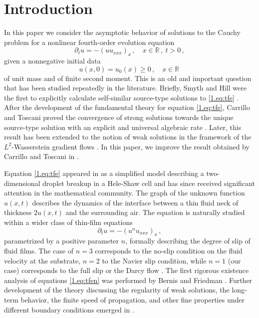 \documentclass[12pt]{amsart}
\let\pa\partial
\newcommand{\R}{{\mathbb R}}
\theoremstyle{plain}
\theoremstyle{definition}
\theoremstyle{remark}
\begin{document}
\section{Introduction}
In this paper we consider the asymptotic behavior of solutions to the Cauchy problem for a nonlinear fourth-order evolution equation
\begin{equation}\label{1.eq:tfe}
    \pa_t u = -\left(uu_{xxx}\right)_{x}\,, \quad x\in\R\,,\ t>0\,,
\end{equation}
given a nonnegative initial data 
\begin{equation}\label{1.eq:id}
    u(x,0) = u_0(x)\geq 0\,,\quad x\in\R\,
\end{equation}
of unit mass and of finite second moment. This is an old and important question that has been studied repeatedly in the literature. Briefly, Smyth and Hill were the first to explicitly calculate self-similar source-type solutions to \eqref{1.eq:tfe} \cite{SmHi88}. After the development of the fundamental theory \cite{BBD95, Ber96, BeFr90, BePu96} for equation \eqref{1.eq:tfe}, Carrillo and Toscani proved the convergence of strong solutions towards the unique source-type solution with an explicit and universal algebraic rate \cite{CaTo02}. Later, this result has been extended to the notion of weak solutions in the framework of the $L^2$-Wasserstein gradient flows \cite{MMS09}. 
In this paper, we improve the result obtained by Carrillo and Toscani in \cite{CaTo02}. 

Equation \eqref{1.eq:tfe} appeared in \cite{CDGKSZ93} as a simplified model describing a two-dimensional droplet breakup in a Hele-Shaw cell and has since received significant attention in the mathematical community. The graph of the unknown function $u(x,t)$ describes the dynamics of the interface between a thin fluid neck of thickness $2u(x,t)$ and the surrounding air. The equation is naturally studied within a wider class of thin-film equations 
\begin{equation}\label{1.eq:tfen}
    \pa_t u = -\left(u^nu_{xxx}\right)_{x}\,, %
\end{equation}
parametrized by a positive parameter $n$, formally describing the degree of slip of fluid films. The case of $n=3$ corresponds to the no-slip condition on the fluid velocity at the substrate, $n=2$ to the Navier slip condition, while $n=1$ (our case) corresponds to the full slip or the Darcy flow \cite{Ber98, Mye98, ODB97}.
The first rigorous existence analysis of equations \eqref{1.eq:tfen} was performed by Bernis and Friedman \cite{BeFr90}. Further development of the theory discussing the regularity of weak solutions, the long-term behavior, the finite speed of propagation, and other fine properties under different boundary conditions emerged in \cite{BeGr05, BBD95, Ber96, BePu96, GiOt01}. 
\end{document}
